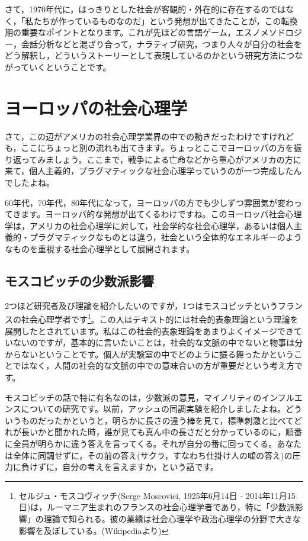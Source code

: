\documentclass{ltjsbook}
\begin{document}
さて，1970年代に，はっきりとした社会が客観的・外在的に存在するのではなく，「私たちが作っているものなのだ」という発想が出てきたことが，この転換期の重要なポイントとなります。これが先ほどの言語ゲーム，エスノメソドロジー，会話分析などと混ざり合って，ナラティブ研究，つまり人々が自分の社会をどう解釈し，どういうストーリーとして表現しているのかという研究方法につながっていくということです。

\section{ヨーロッパの社会心理学}
さて，この辺がアメリカの社会心理学業界の中での動きだったわけですけれども，ここにちょっと別の流れも出てきます。ちょっとここでヨーロッパの方を振り返ってみましょう。ここまで，戦争による亡命などから重心がアメリカの方に来て，個人主義的，プラグマティックな社会心理学っていうのが一つ完成したんでしたよね。

60年代，70年代，80年代になって，ヨーロッパの方でも少しずつ雰囲気が変わってきます。ヨーロッパ的な発想が出てくるわけですね。このヨーロッパ社会心理学は，アメリカの社会心理学に対して，社会学的な社会心理学，あるいは個人主義的・プラグマティックなものとは違う，社会という全体的なエネルギーのようなものを重視する社会心理学として展開されます。
\subsection{モスコビッチの少数派影響}
2つほど研究者及び理論を紹介したいのですが，1つはモスコビッチというフランスの社会心理学者です\footnote{セルジュ・モスコヴィッチ(Serge Moscovici, 1925年6月14日 - 2014年11月15日)は，ルーマニア生まれのフランスの社会心理学者であり，特に「少数派影響」の理論で知られる。彼の業績は社会心理学や政治心理学の分野で大きな影響を及ぼしている。(Wikipediaより)}。この人はテキスト的には社会的表象理論という理論を展開したとされています。私はこの社会的表象理論をあまりよくイメージできていないのですが，基本的に言いたいことは，社会的な文脈の中でないと物事は分からないということです。個人が実験室の中でどのように振る舞ったかということではなく，人間の社会的な文脈の中での意味合いの方が重要だという考え方です。

モスコビッチの話で特に有名なのは，少数派の意見，マイノリティのインフルエンスについての研究です。以前，アッシュの同調実験を紹介しましたよね。どういうものだったかというと，明らかに長さの違う棒を見て，標準刺激と比べてどれが長いかと聞かれた時，誰が見ても真ん中の長さだと分かっているのに，順番に全員が明らかに違う答えを言ってくる。それが自分の番に回ってくる。あなたは全体に同調せずに，その前の答え(サクラ，すなわち仕掛け人の嘘の答え)の圧力に負けずに，自分の考えを言えますか，という話です。
\end{document}
